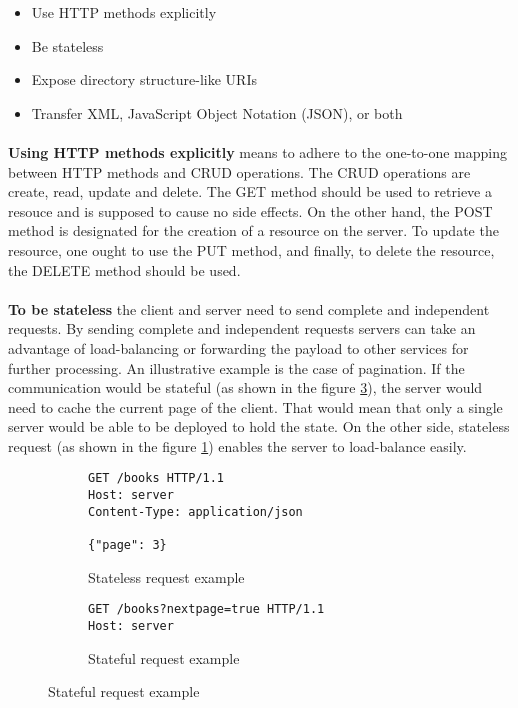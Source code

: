 \begin{itemize}
  \item Use HTTP methods explicitly
  \item Be stateless
  \item Expose directory structure-like URIs
  \item Transfer XML, JavaScript Object Notation (JSON), or both
\end{itemize}

\paragraph{}
\textbf{Using HTTP methods explicitly} means to adhere to the one-to-one mapping between HTTP methods and CRUD operations. The CRUD operations are create, read, update and delete. The GET method should be used to retrieve a resouce and is supposed to cause no side effects. On the other hand, the POST method is designated for the creation of a resource on the server. To update the resource, one ought to use the PUT method, and finally, to delete the resource, the DELETE method should be used.

\paragraph{}
\textbf{To be stateless} the client and server need to send complete and independent requests. By sending complete and independent requests servers can take an advantage of load-balancing or forwarding the payload to other services for further processing. An illustrative example is the case of pagination. If the communication would be stateful (as shown in the figure \ref{fig:Stateful request example}), the server would need to cache the current page of the client. That would mean that only a single server would be able to be deployed to hold the state. On the other side, stateless request (as shown in the figure \ref{fig:Stateless request example}) enables the server to load-balance easily.

\begin{figure}[h]
  \begin{subfigure}{}
    \begin{minipage}{0.5\textwidth}
      \begin{verbatim}
GET /books HTTP/1.1
Host: server
Content-Type: application/json

{"page": 3}
      \end{verbatim}
      \caption{Stateless request example}
      \label{fig:Stateless request example}
    \end{minipage}
  \end{subfigure}
  \begin{subfigure}{}
    \begin{minipage}{0.5\textwidth}
      \begin{verbatim}
GET /books?nextpage=true HTTP/1.1
Host: server
      \end{verbatim}
      \caption{Stateful request example}
      \label{fig:Stateful request example}
    \end{minipage}
  \end{subfigure}
\end{figure}

